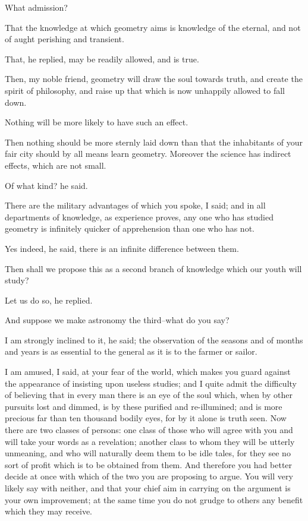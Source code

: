 What admission?

That the knowledge at which geometry aims is knowledge of the eternal,
and not of aught perishing and transient.

That, he replied, may be readily allowed, and is true.

Then, my noble friend, geometry will draw the soul towards truth,
and create the spirit of philosophy, and raise up that which is now
unhappily allowed to fall down.

Nothing will be more likely to have such an effect.

Then nothing should be more sternly laid down than that the inhabitants
of your fair city should by all means learn geometry. Moreover the
science has indirect effects, which are not small.

Of what kind? he said.

There are the military advantages of which you spoke, I said; and in all
departments of knowledge, as experience proves, any one who has studied
geometry is infinitely quicker of apprehension than one who has not.

Yes indeed, he said, there is an infinite difference between them.

Then shall we propose this as a second branch of knowledge which our
youth will study?

Let us do so, he replied.

And suppose we make astronomy the third--what do you say?

I am strongly inclined to it, he said; the observation of the seasons
and of months and years is as essential to the general as it is to the
farmer or sailor.

I am amused, I said, at your fear of the world, which makes you guard
against the appearance of insisting upon useless studies; and I quite
admit the difficulty of believing that in every man there is an eye
of the soul which, when by other pursuits lost and dimmed, is by these
purified and re-illumined; and is more precious far than ten thousand
bodily eyes, for by it alone is truth seen. Now there are two classes of
persons: one class of those who will agree with you and will take
your words as a revelation; another class to whom they will be utterly
unmeaning, and who will naturally deem them to be idle tales, for they
see no sort of profit which is to be obtained from them. And therefore
you had better decide at once with which of the two you are proposing to
argue. You will very likely say with neither, and that your chief aim in
carrying on the argument is your own improvement; at the same time you
do not grudge to others any benefit which they may receive.

